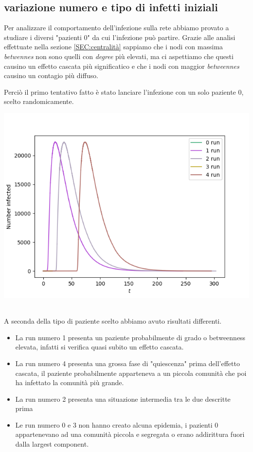 \documentclass[a4paper]{article}
\begin{document}
\subsection{ variazione numero e tipo di infetti iniziali}
Per analizzare il comportamento dell'infezione sulla rete abbiamo provato a studiare i diversi "pazienti 0" da cui l'infezione può partire.
Grazie alle analisi effettuate nella sezione \ref{SEC:centralità} sappiamo che i nodi con massima \textit{betwennes} non sono quelli con \textit{degree} più elevati, ma ci aspettiamo che questi causino un effetto cascata più significatico e che i nodi con maggior \textit{betweennes} causino un contagio più diffuso.

Perciò il primo tentativo fatto è stato lanciare l'infezione con un solo paziente 0, scelto randomicamente.\\
\begin{centering}\includegraphics[width=1\textwidth]{1_random.png}\end{centering}\\
A seconda della tipo di paziente scelto abbiamo avuto risultati differenti.
\begin{itemize}
	\item La run numero 1 presenta un paziente probabilmente di grado o betweenness elevata, infatti si verifica quasi subito un effetto cascata.
	\item La run numero 4 presenta una grossa fase di "quiescenza" prima dell'effetto cascata, il paziente probabilmente apparteneva a un piccola comunità che poi ha infettato la comunità più grande.
	\item La run numero 2 presenta una situazione intermedia tra le due descritte prima
	\item Le run numero 0 e 3 non hanno creato alcuna epidemia, i pazienti 0 appartenevano ad una comunità piccola e segregata o erano addirittura fuori dalla largest component.
\end{itemize}
\end{document}
